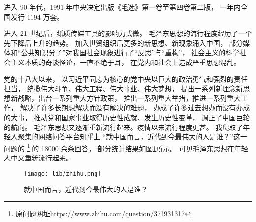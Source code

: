 \documentclass{ctexart}
\begin{document}
进入 90 年代，1991 年中央决定出版《毛选》第一卷至第四卷第二版，
一年内全国发行 1194 万套。

进入 21 世纪后，纸质传媒工具的影响力式微。
毛泽东思想的流行程度经历了一个先下降后上升的趋势。
加入世贸组织后更多的新思想、新现象涌入中国，
部分媒体和“公共知识分子”对我国社会现象进行了“反思”与“重构”，
社会主义的科学社会主义本质的奇谈怪论，一直不绝于耳，
在党内和社会上造成严重思想混乱。

党的十八大以来，
以习近平同志为核心的党中央以巨大的政治勇气和强烈的责任担当，
统揽伟大斗争、伟大工程、伟大事业、伟大梦想，
提出一系列新理念新思想新战略，出台一系列重大方针政策，
推出一系列重大举措，推进一系列重大工作，
解决了许多长期想解决而没有解决的难题，
办成了许多过去想办而没有办成的大事，
推动党和国家事业取得历史性成就、发生历史性变革，
调正了中国巨轮的航向。
毛泽东思想又逐渐重新流行起来。疫情以来流行程度更甚。
我爬取了年轻人聚集的网络问答平台知乎上
“就中国而言，近代到今最伟大的人是谁？”这一问题的
\footnote{原问题网址\url{https://www.zhihu.com/question/371931317}}
的 18000 余条回答，
部分统计结果如图\ref{zhihu}所示。
可见毛泽东思想在年轻人中又重新流行起来。

\begin{figure}
	\texttt{[image: lib/zhihu.png]}
	\caption{就中国而言，近代到今最伟大的人是谁？}
	\label{zhihu}
\end{figure}
\end{document}
